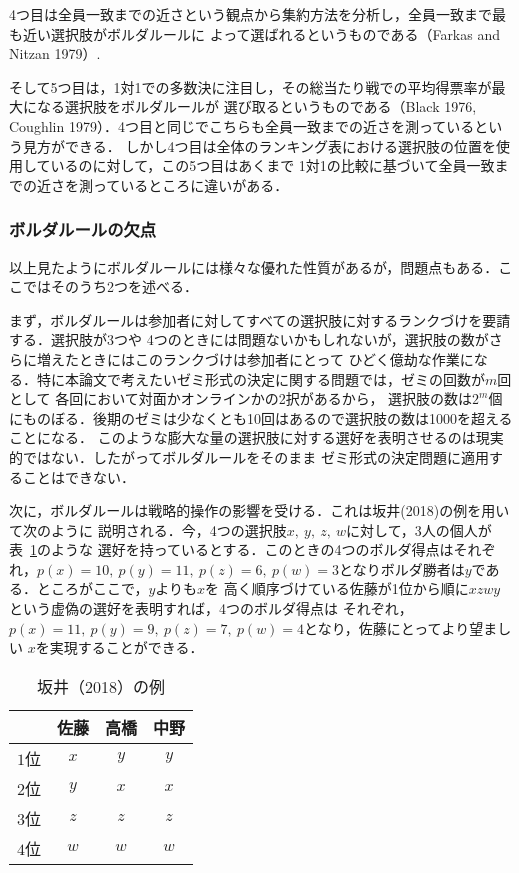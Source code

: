 \documentclass[dvipdfmx]{jsarticle}
\begin{document}
4つ目は全員一致までの近さという観点から集約方法を分析し，全員一致まで最も近い選択肢がボルダルールに
よって選ばれるというものである（Farkas and Nitzan 1979）.

そして5つ目は，1対1での多数決に注目し，その総当たり戦での平均得票率が最大になる選択肢をボルダルールが
選び取るというものである（Black 1976, Coughlin 1979）．4つ目と同じでこちらも全員一致までの近さを測っているという見方ができる．
しかし4つ目は全体のランキング表における選択肢の位置を使用しているのに対して，この5つ目はあくまで
1対1の比較に基づいて全員一致までの近さを測っているところに違いがある．

\subsubsection{ボルダルールの欠点}\label{ボルダルールの欠点}
以上見たようにボルダルールには様々な優れた性質があるが，問題点もある．ここではそのうち2つを述べる．

まず，ボルダルールは参加者に対してすべての選択肢に対するランクづけを要請する．選択肢が3つや
4つのときには問題ないかもしれないが，選択肢の数がさらに増えたときにはこのランクづけは参加者にとって
ひどく億劫な作業になる．特に本論文で考えたいゼミ形式の決定に関する問題では，ゼミの回数が$m$回として
各回において対面かオンラインかの2択があるから，
選択肢の数は$2^m$個にものぼる．後期のゼミは少なくとも10回はあるので選択肢の数は1000を超えることになる．
このような膨大な量の選択肢に対する選好を表明させるのは現実的ではない．したがってボルダルールをそのまま
ゼミ形式の決定問題に適用することはできない．

次に，ボルダルールは戦略的操作の影響を受ける．これは坂井(2018)の例を用いて次のように
説明される．今，4つの選択肢$x,\ y,\ z,\ w$に対して，3人の個人が表~\ref{Sakai2018}のような
選好を持っているとする．このときの4つのボルダ得点はそれぞれ，$p(x) = 10,\ p(y) = 11,
\ p(z) = 6, \ p(w) = 3$となりボルダ勝者は$y$である．ところがここで，$y$よりも$x$を
高く順序づけている佐藤が1位から順に$xzwy$という虚偽の選好を表明すれば，4つのボルダ得点は
それぞれ，$p(x) = 11,\ p(y) = 9,\ p(z) = 7, \ p(w) = 4$となり，佐藤にとってより望ましい
$x$を実現することができる．

\begin{table}[h]
  \caption{坂井（2018）の例}\label{Sakai2018}
  \begin{center}
    \begin{tabular}{c|c|c|c} \hline
        & 佐藤 & 高橋 & 中野 \\ \hline
      $1$位 & $x$ & $y$ & $y$ \\
      $2$位 & $y$ & $x$ & $x$ \\
      $3$位 & $z$ & $z$ & $z$ \\
      $4$位 & $w$ & $w$ & $w$ \\ \hline
    \end{tabular}
  \end{center}
\end{table}
\end{document}
